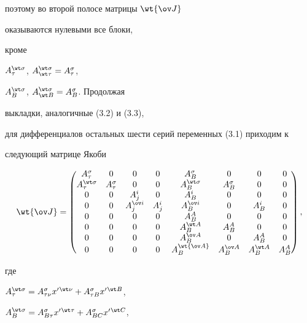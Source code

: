 поэтому во второй полосе матрицы $\wt{\ov J}$


оказываются нулевыми все блоки,


кроме


$A^{\wt\sigma}_\tau$, $A^{\wt\sigma}_{\wt\tau}=A^\sigma_\tau$,


$A^{\wt\sigma}_B$, $A^{\wt\sigma}_{\wt B}=A^\sigma_B$. Продолжая


выкладки, аналогичные (3.2) и (3.3),


для дифференциалов остальных шести серий переменных (3.1) приходим к


следующий матрице Якоби


\begin{equation}


\wt{\ov J}=


\begin{pmatrix}


A^\sigma_\tau & 0 & 0 & 0 & A^\sigma_B & 0 & 0 & 0 \\


A^{\wt\sigma}_\tau & A^\sigma_\tau & 0 & 0 & A^{\wt\sigma}_B &


A^\sigma_B & 0 & 0 \\


0 & 0 & A^i_j & 0 & A^i_B & 0 & 0 & 0 \\


0 & 0 & A^{\ov i}_j & A^i_j & A^{\ov i}_B & 0 & A^i_B & 0 \\


0 & 0 & 0 & 0 & A^A_B & 0 & 0 & 0 \\


0 & 0 & 0 & 0 & A^{\wt A}_B & A^A_B & 0 & 0 \\


0 & 0 & 0 & 0 & A^{\ov A}_B & 0 & A^A_B & 0 \\


0 & 0 & 0 & 0 & A^{\wt{\ov A}}_B & A^{\ov A}_B & A^{\wt A}_B & A^A_B


\end{pmatrix}


,


\end{equation}


где


$A^{\wt\sigma}_\tau=A^\sigma_{\tau\nu}x'{}^{\wt\nu}+


A^\sigma_{\tau B}x'{}^{\wt B}$,


$A^{\wt\sigma}_B=A^\sigma_{B\tau}x'{}^{\wt\tau}+


A^\sigma_{BC}x'{}^{\wt C}$,


